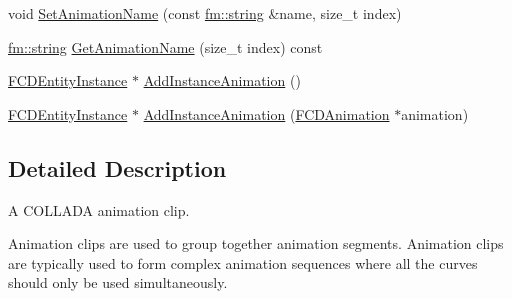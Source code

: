 \begin{DoxyCompactItemize}
\item 
void \hyperlink{classFCDAnimationClip_a583019dc6402e191b3a977ab601087fe}{SetAnimationName} (const \hyperlink{classfm_1_1stringT}{fm::string} \&name, size\_\-t index)
\item 
\hyperlink{classfm_1_1stringT}{fm::string} \hyperlink{classFCDAnimationClip_a6d952c3811daafcddc5b340dcdc519cb}{GetAnimationName} (size\_\-t index) const 
\item 
\hyperlink{classFCDEntityInstance}{FCDEntityInstance} $\ast$ \hyperlink{classFCDAnimationClip_a5bde27d1a1ac44745e74d611117fabe6}{AddInstanceAnimation} ()
\item 
\hyperlink{classFCDEntityInstance}{FCDEntityInstance} $\ast$ \hyperlink{classFCDAnimationClip_a3062d021cc77dc77063d669db4ca3322}{AddInstanceAnimation} (\hyperlink{classFCDAnimation}{FCDAnimation} $\ast$animation)
\end{DoxyCompactItemize}


\subsection{Detailed Description}
A COLLADA animation clip.

Animation clips are used to group together animation segments. Animation clips are typically used to form complex animation sequences where all the curves should only be used simultaneously. 


